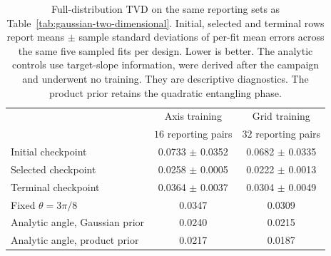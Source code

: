 \begin{table}[!t]
\caption{Full-distribution TVD on the same reporting sets as Table~\ref{tab:gaussian-two-dimensional}. Initial, selected and terminal rows report means $\pm$ sample standard deviations of per-fit mean errors across the same five sampled fits per design. Lower is better. The analytic controls use target-slope information, were derived after the campaign and underwent no training. They are descriptive diagnostics. The product prior retains the quadratic entangling phase.}
\label{tab:gaussian-phase-controls}
\centering
\begin{tabular}{lcc}\toprule
 & Axis training & Grid training\\
 & $16$ reporting pairs & $32$ reporting pairs\\\midrule
Initial checkpoint & 0.0733 $\pm$ 0.0352 & 0.0682 $\pm$ 0.0335\\
Selected checkpoint & 0.0258 $\pm$ 0.0005 & 0.0222 $\pm$ 0.0013\\
Terminal checkpoint & 0.0364 $\pm$ 0.0037 & 0.0304 $\pm$ 0.0049\\
Fixed $\theta=3\pi/8$ & 0.0347 & 0.0309\\
Analytic angle, Gaussian prior & 0.0240 & 0.0215\\
Analytic angle, product prior & 0.0217 & 0.0187\\
\bottomrule
\end{tabular}
\end{table}
